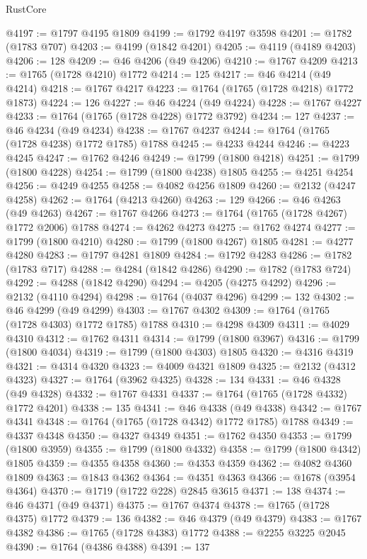 \begin{lexlean}{RustCore}
\begin{coremodule}
@4197 := @1797 @4195 @1809
@4199 := @1792 @4197 @3598
@4201 := @1782 (@1783 @707)
@4203 := @4199 (@1842 @4201)
@4205 := @4119 (@4189 @4203)
@4206 := 128
@4209 := @46 @4206 (@49 @4206)
@4210 := @1767 @4209
@4213 := @1765 (@1728 @4210) @1772
@4214 := 125
@4217 := @46 @4214 (@49 @4214)
@4218 := @1767 @4217
@4223 := @1764 (@1765 (@1728 @4218) @1772 @1873)
@4224 := 126
@4227 := @46 @4224 (@49 @4224)
@4228 := @1767 @4227
@4233 := @1764 (@1765 (@1728 @4228) @1772 @3792)
@4234 := 127
@4237 := @46 @4234 (@49 @4234)
@4238 := @1767 @4237
@4244 := @1764 (@1765 (@1728 @4238) @1772 @1785) @1788
@4245 := @4233 @4244
@4246 := @4223 @4245
@4247 := @1762 @4246
@4249 := @1799 (@1800 @4218)
@4251 := @1799 (@1800 @4228)
@4254 := @1799 (@1800 @4238) @1805
@4255 := @4251 @4254
@4256 := @4249 @4255
@4258 := @4082 @4256 @1809
@4260 := @2132 (@4247 @4258)
@4262 := @1764 (@4213 @4260)
@4263 := 129
@4266 := @46 @4263 (@49 @4263)
@4267 := @1767 @4266
@4273 := @1764 (@1765 (@1728 @4267) @1772 @2006) @1788
@4274 := @4262 @4273
@4275 := @1762 @4274
@4277 := @1799 (@1800 @4210)
@4280 := @1799 (@1800 @4267) @1805
@4281 := @4277 @4280
@4283 := @1797 @4281 @1809
@4284 := @1792 @4283
@4286 := @1782 (@1783 @717)
@4288 := @4284 (@1842 @4286)
@4290 := @1782 (@1783 @724)
@4292 := @4288 (@1842 @4290)
@4294 := @4205 (@4275 @4292)
@4296 := @2132 (@4110 @4294)
@4298 := @1764 (@4037 @4296)
@4299 := 132
@4302 := @46 @4299 (@49 @4299)
@4303 := @1767 @4302
@4309 := @1764 (@1765 (@1728 @4303) @1772 @1785) @1788
@4310 := @4298 @4309
@4311 := @4029 @4310
@4312 := @1762 @4311
@4314 := @1799 (@1800 @3967)
@4316 := @1799 (@1800 @4034)
@4319 := @1799 (@1800 @4303) @1805
@4320 := @4316 @4319
@4321 := @4314 @4320
@4323 := @4009 @4321 @1809
@4325 := @2132 (@4312 @4323)
@4327 := @1764 (@3962 @4325)
@4328 := 134
@4331 := @46 @4328 (@49 @4328)
@4332 := @1767 @4331
@4337 := @1764 (@1765 (@1728 @4332) @1772 @4201)
@4338 := 135
@4341 := @46 @4338 (@49 @4338)
@4342 := @1767 @4341
@4348 := @1764 (@1765 (@1728 @4342) @1772 @1785) @1788
@4349 := @4337 @4348
@4350 := @4327 @4349
@4351 := @1762 @4350
@4353 := @1799 (@1800 @3959)
@4355 := @1799 (@1800 @4332)
@4358 := @1799 (@1800 @4342) @1805
@4359 := @4355 @4358
@4360 := @4353 @4359
@4362 := @4082 @4360 @1809
@4363 := @1843 @4362
@4364 := @4351 @4363
@4366 := @1678 (@3954 @4364)
@4370 := @1719 (@1722 @228) @2845 @3615
@4371 := 138
@4374 := @46 @4371 (@49 @4371)
@4375 := @1767 @4374
@4378 := @1765 (@1728 @4375) @1772
@4379 := 136
@4382 := @46 @4379 (@49 @4379)
@4383 := @1767 @4382
@4386 := @1765 (@1728 @4383) @1772
@4388 := @2255 @3225 @2045
@4390 := @1764 (@4386 @4388)
@4391 := 137

\end{coremodule}
\end{lexlean}
